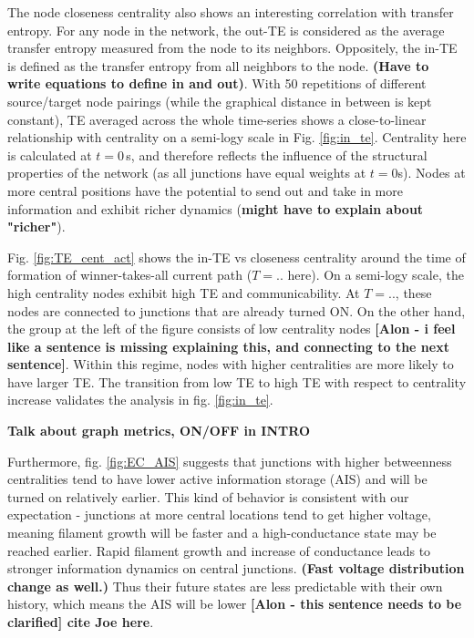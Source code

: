 \documentclass[fleqn,10pt,  amsmath,amssymb,aps]{wlscirep}
\begin{document}
The node closeness centrality also shows an interesting correlation with transfer entropy. For any node in the network, the out-TE is considered as the average transfer entropy measured from the node to its neighbors. Oppositely, the in-TE is defined as the transfer entropy from all neighbors to the node. \textbf{(Have to write equations to define in and out)}. With 50 repetitions of different source/target node pairings (while the graphical distance in between is kept constant), TE averaged across the whole time-series shows a close-to-linear relationship with centrality on a semi-logy scale in Fig. \ref{fig:in_te}. Centrality here is calculated at $t = 0\,$s, and therefore reflects the influence of the structural properties of the network (as all junctions have equal weights at $t = 0$s). Nodes at more central positions have the potential to send out and take in more information and exhibit richer dynamics (\textbf{might have to explain about "richer"}).

Fig. \ref{fig:TE_cent_act} shows the in-TE vs closeness centrality around the time of formation of winner-takes-all current path ($T = ..$ here). On a semi-logy scale, the high centrality nodes exhibit high TE and communicability. At $T = ..$, these nodes are connected to junctions that are already turned ON. On the other hand, the group at the left of the figure consists of low centrality nodes \textbf{[Alon - i feel like a sentence is missing explaining this, and connecting to the next sentence]}. Within this regime, nodes with higher centralities are more likely to have larger TE. The transition from low TE to high TE with respect to centrality increase validates the analysis in fig. \ref{fig:in_te}.

\textbf{Talk about graph metrics, ON/OFF in INTRO}

Furthermore, fig. \ref{fig:EC_AIS} suggests that junctions with higher betweenness centralities tend to have lower active information storage (AIS) and will be turned on relatively earlier. This kind of behavior is consistent with our expectation - junctions at more central locations tend to get higher voltage, meaning filament growth will be faster and a high-conductance state may be reached earlier. Rapid filament growth and increase of conductance leads to stronger information dynamics on central junctions. \textbf{(Fast voltage distribution change as well.)} Thus their future states are less predictable with their own history, which means the AIS will be lower \textbf{[Alon - this sentence needs to be clarified] cite Joe here}.
\end{document}
